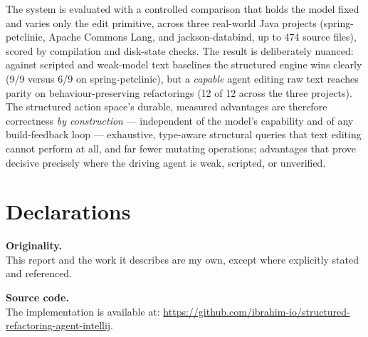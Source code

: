 \documentclass[11pt,a4paper]{report}
\begin{document}
The system is evaluated with a controlled comparison that holds the model fixed and
varies only the edit primitive, across three real-world Java projects (spring-petclinic,
Apache Commons Lang, and jackson-databind, up to 474 source files), scored by
compilation and disk-state checks. The result is deliberately nuanced: against scripted
and weak-model text baselines the structured engine wins clearly (9/9 versus 6/9 on
spring-petclinic), but a \emph{capable} agent editing raw text reaches parity on
behaviour-preserving refactorings (12 of 12 across the three projects). The structured
action space's durable, measured advantages are therefore correctness \emph{by
construction} --- independent of the model's capability and of any build-feedback loop
--- exhaustive, type-aware structural queries that text editing cannot perform at all,
and far fewer mutating operations; advantages that prove decisive precisely where the
driving agent is weak, scripted, or unverified.

\chapter*{Declarations}

\noindent\textbf{Originality.}\\
This report and the work it describes are my own, except where explicitly stated and
referenced.

\vspace{1em}
\noindent\textbf{Source code.}\\
The implementation is available at:
\url{https://github.com/ibrahim-io/structured-refactoring-agent-intellij}.
\end{document}
